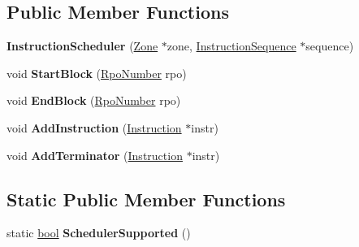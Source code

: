 \subsection*{Public Member Functions}
\begin{DoxyCompactItemize}
\item 
\mbox{\label{classv8_1_1internal_1_1compiler_1_1InstructionScheduler_a05e3da1730c88297d072e4a72aa9b95d}} 
{\bfseries Instruction\+Scheduler} (\mbox{\hyperlink{classv8_1_1internal_1_1Zone}{Zone}} $\ast$zone, \mbox{\hyperlink{classv8_1_1internal_1_1compiler_1_1InstructionSequence}{Instruction\+Sequence}} $\ast$sequence)
\item 
\mbox{\label{classv8_1_1internal_1_1compiler_1_1InstructionScheduler_a2fdf835db37886ba20a703d0d464613a}} 
void {\bfseries Start\+Block} (\mbox{\hyperlink{classv8_1_1internal_1_1compiler_1_1RpoNumber}{Rpo\+Number}} rpo)
\item 
\mbox{\label{classv8_1_1internal_1_1compiler_1_1InstructionScheduler_aef690db2c8ec7eab249c4bd5c1a3f4b7}} 
void {\bfseries End\+Block} (\mbox{\hyperlink{classv8_1_1internal_1_1compiler_1_1RpoNumber}{Rpo\+Number}} rpo)
\item 
\mbox{\label{classv8_1_1internal_1_1compiler_1_1InstructionScheduler_abd121cebb713f0e800ed05ed10ea3d3f}} 
void {\bfseries Add\+Instruction} (\mbox{\hyperlink{classv8_1_1internal_1_1compiler_1_1Instruction}{Instruction}} $\ast$instr)
\item 
\mbox{\label{classv8_1_1internal_1_1compiler_1_1InstructionScheduler_a7e3ba64a2973e70f1f6211807279dfd0}} 
void {\bfseries Add\+Terminator} (\mbox{\hyperlink{classv8_1_1internal_1_1compiler_1_1Instruction}{Instruction}} $\ast$instr)
\end{DoxyCompactItemize}
\subsection*{Static Public Member Functions}
\begin{DoxyCompactItemize}
\item 
\mbox{\label{classv8_1_1internal_1_1compiler_1_1InstructionScheduler_a3a12caa2a5f6def102ff7e343f7b8e5f}} 
static \mbox{\hyperlink{classbool}{bool}} {\bfseries Scheduler\+Supported} ()
\end{DoxyCompactItemize}
